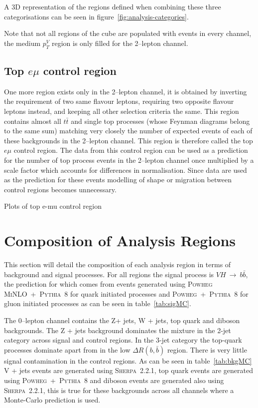 A 3D representation of the regions defined when combining these three
categorisations can be seen in figure~\ref{fig:analysis-categories}.

Note that not all regions of the cube are populated with events in every channel, the medium
$p_T^V$ region is only filled for the 2--lepton channel.

\subsection{Top \texorpdfstring{$e \mu$}{e mu} control region}%
\label{sec:topemucr}

One more region exists only in the 2--lepton channel, it is obtained by inverting the
requirement of two same flavour leptons, requiring two opposite flavour leptons
instead, and keeping all other selection criteria the same. This region contains
almost all $t\bar{t}$ and single top processes (whose Feynman diagrams belong to
the same sum) matching very closely the number of expected events of each of
these backgrounds in the 2--lepton channel. This region is therefore called the
top $e \mu$ control region. The data from this control region can be used as a
prediction for the number of top process events in the 2--lepton channel once
multiplied by a scale factor which accounts for differences in normalisation.
Since data are used as the prediction for these events modelling of shape or
migration between control regions becomes unnecessary.

Plots of top e-mu control region

\section{Composition of Analysis Regions}

This section will detail the composition of each analysis region in terms of
background and signal processes. For all regions the signal process is
$VH~\rightarrow~b\bar{b}$, the prediction for which comes from events generated
using \textsc{Powheg MiNLO}~+~\textsc{Pythia~8} for quark initiated processes
and \textsc{Powheg}~+~\textsc{Pythia~8} for gluon initiated processes as can be
seen in table~\ref{tab:sigMC}.
 


The 0--lepton channel contains the  Z+ jets, W + jets, top quark and diboson
backgrounds. The Z + jets background dominates the mixture in the 2-jet category
across signal and control regions. In the 3-jet category the top-quark processes
dominate apart from in the low $\Delta R(b, \bar{b})$ region. There is very
little signal contamination in the control regions. As can be seen in
table~\ref{tab:bkgMC} V + jets events are generated using \textsc{Sherpa~2.2.1},
top quark events are generated using \textsc{Powheg}~+~\textsc{Pythia~8} and
diboson events are generated also using \textsc{Sherpa~2.2.1}, this is true for
these backgrounds across all channels where a Monte-Carlo prediction is used.

